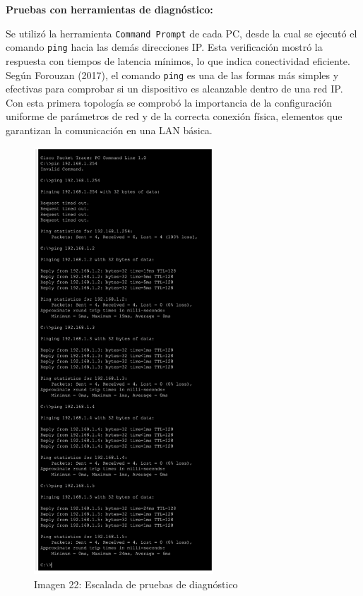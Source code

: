 \documentclass[letterpaper,12pt,oneside]{article}
\begin{document}
\textbf{Pruebas con herramientas de diagnóstico:} 

Se utilizó la herramienta \texttt{Command Prompt} de cada PC, desde la cual se ejecutó el comando \texttt{ping} hacia las demás direcciones IP. Esta verificación mostró la respuesta con tiempos de latencia mínimos, lo que indica conectividad eficiente. Según Forouzan (2017), el comando \texttt{ping} es una de las formas más simples y efectivas para comprobar si un dispositivo es alcanzable dentro de una red IP. Con esta primera topología se comprobó la importancia de la configuración uniforme de parámetros de red y de la correcta conexión física, elementos que garantizan la comunicación en una LAN básica.

\begin{figure}[H]
\centering
\includegraphics[width=0.6\textwidth]{22.png}
\caption{Imagen 22: Escalada de pruebas de diagnóstico}
\end{figure}
\end{document}
